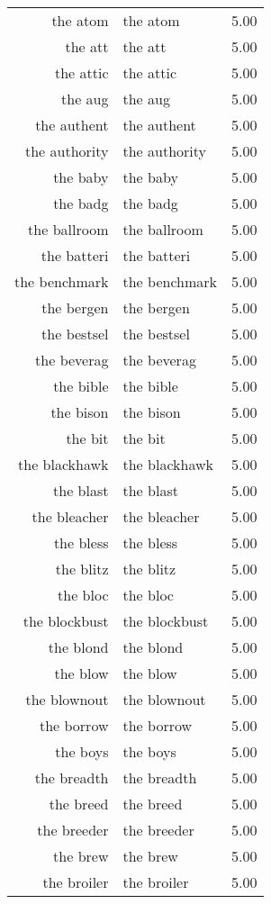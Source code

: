 \begin{table}[ht]
\begin{tabular}{rlr}
  the atom & the atom & 5.00 \\ 
  the att & the att & 5.00 \\ 
  the attic & the attic & 5.00 \\ 
  the aug & the aug & 5.00 \\ 
  the authent & the authent & 5.00 \\ 
  the authority & the authority & 5.00 \\ 
  the baby & the baby & 5.00 \\ 
  the badg & the badg & 5.00 \\ 
  the ballroom & the ballroom & 5.00 \\ 
  the batteri & the batteri & 5.00 \\ 
  the benchmark & the benchmark & 5.00 \\ 
  the bergen & the bergen & 5.00 \\ 
  the bestsel & the bestsel & 5.00 \\ 
  the beverag & the beverag & 5.00 \\ 
  the bible & the bible & 5.00 \\ 
  the bison & the bison & 5.00 \\ 
  the bit & the bit & 5.00 \\ 
  the blackhawk & the blackhawk & 5.00 \\ 
  the blast & the blast & 5.00 \\ 
  the bleacher & the bleacher & 5.00 \\ 
  the bless & the bless & 5.00 \\ 
  the blitz & the blitz & 5.00 \\ 
  the bloc & the bloc & 5.00 \\ 
  the blockbust & the blockbust & 5.00 \\ 
  the blond & the blond & 5.00 \\ 
  the blow & the blow & 5.00 \\ 
  the blownout & the blownout & 5.00 \\ 
  the borrow & the borrow & 5.00 \\ 
  the boys & the boys & 5.00 \\ 
  the breadth & the breadth & 5.00 \\ 
  the breed & the breed & 5.00 \\ 
  the breeder & the breeder & 5.00 \\ 
  the brew & the brew & 5.00 \\ 
  the broiler & the broiler & 5.00 \\ 

\end{tabular}
\end{table}
